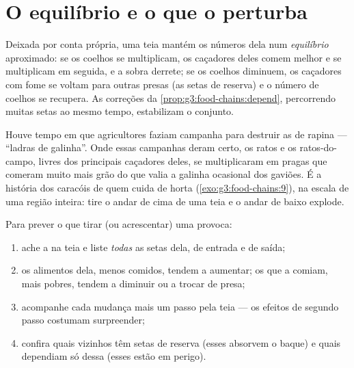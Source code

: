 \section{O equilíbrio e o que o perturba}

\begin{proposition}\label{prop:g5:food-webs:balance}
Deixada por conta própria, uma teia mantém os números dela num
\emph{equilíbrio}
aproximado: se os coelhos se multiplicam, os caçadores deles comem
melhor e se multiplicam em seguida, e a sobra derrete; se os coelhos
diminuem, os caçadores com fome se voltam para outras presas (as
setas de reserva) e o número de coelhos se recupera. As correções da
\cref{prop:g3:food-chains:depend}, percorrendo muitas setas ao mesmo
tempo, estabilizam o conjunto.
\end{proposition}
\admitted

\begin{example}\label{ex:g5:food-webs:mistake}
Houve tempo em que agricultores faziam campanha para destruir as
 de rapina --- ``ladras de galinha''. Onde essas campanhas deram
certo, os ratos e os ratos-do-campo, livres dos principais caçadores
deles, se multiplicaram em pragas que comeram muito mais grão do que
valia a galinha ocasional dos gaviões. É a história dos caracóis de
quem cuida de horta (\cref{exo:g3:food-chains:9}), na escala de uma
região inteira: tire o andar de cima de uma teia e o andar de baixo
explode.
\end{example}

\begin{method}\label{met:g5:food-webs:predict}
Para prever o que tirar (ou acrescentar) uma  provoca:
\begin{enumerate}
  \item ache a  na teia e liste \emph{todas} as setas dela,
        de entrada e de saída;
  \item os alimentos dela, menos comidos, tendem a aumentar; os que
        a comiam, mais pobres, tendem a diminuir ou a trocar de
        presa;
  \item acompanhe cada mudança mais um passo pela teia --- os
        efeitos de segundo passo costumam surpreender;
  \item confira quais vizinhos têm setas de reserva (esses absorvem
        o baque) e quais dependiam só dessa  (esses estão em
        perigo).
\end{enumerate}
\end{method}

